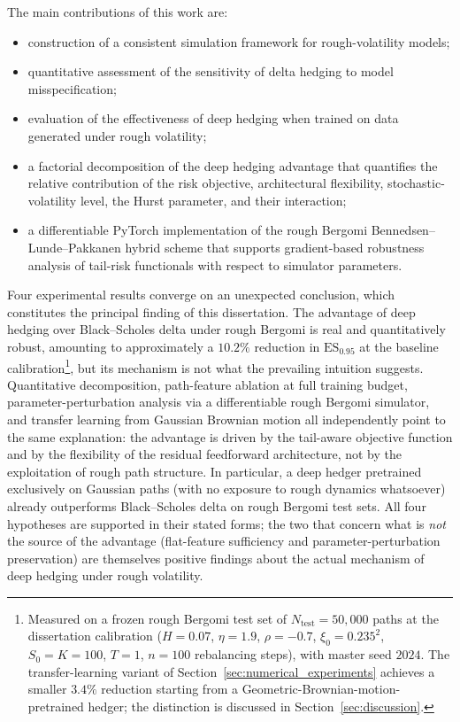\documentclass[12pt,a4paper]{article}
\theoremstyle{definition}
\theoremstyle{plain}
\theoremstyle{remark}
\theoremstyle{plain}
\begin{document}
The main contributions of this work are:
\begin{itemize}
    \item construction of a consistent simulation framework for rough-volatility models;
    \item quantitative assessment of the sensitivity of delta hedging to model misspecification;
    \item evaluation of the effectiveness of deep hedging when trained on data generated under rough volatility;
    \item a factorial decomposition of the deep hedging advantage that quantifies the relative contribution of the risk objective, architectural flexibility, stochastic-volatility level, the Hurst parameter, and their interaction;
    \item a differentiable PyTorch implementation of the rough Bergomi Bennedsen--Lunde--Pakkanen hybrid scheme that supports gradient-based robustness analysis of tail-risk functionals with respect to simulator parameters.
\end{itemize}

Four experimental results converge on an unexpected conclusion, which constitutes the principal finding of this dissertation. The advantage of deep hedging over Black--Scholes delta under rough Bergomi is real and quantitatively robust, amounting to approximately a $10.2\%$ reduction in $\mathrm{ES}_{0.95}$ at the baseline calibration\footnote{Measured on a frozen rough Bergomi test set of $N_{\mathrm{test}} = 50{,}000$ paths at the dissertation calibration ($H=0.07$, $\eta=1.9$, $\rho=-0.7$, $\xi_0 = 0.235^2$, $S_0 = K = 100$, $T=1$, $n=100$ rebalancing steps), with master seed $2024$. The transfer-learning variant of Section~\ref{sec:numerical_experiments} achieves a smaller $3.4\%$ reduction starting from a Geometric-Brownian-motion-pretrained hedger; the distinction is discussed in Section~\ref{sec:discussion}.}, but its mechanism is not what the prevailing intuition suggests. Quantitative decomposition, path-feature ablation at full training budget, parameter-perturbation analysis via a differentiable rough Bergomi simulator, and transfer learning from Gaussian Brownian motion all independently point to the same explanation: the advantage is driven by the tail-aware objective function and by the flexibility of the residual feedforward architecture, not by the exploitation of rough path structure. In particular, a deep hedger pretrained exclusively on Gaussian paths (with no exposure to rough dynamics whatsoever) already outperforms Black--Scholes delta on rough Bergomi test sets. All four hypotheses are supported in their stated forms; the two that concern what is \emph{not} the source of the advantage (flat-feature sufficiency and parameter-perturbation preservation) are themselves positive findings about the actual mechanism of deep hedging under rough volatility.
\end{document}
